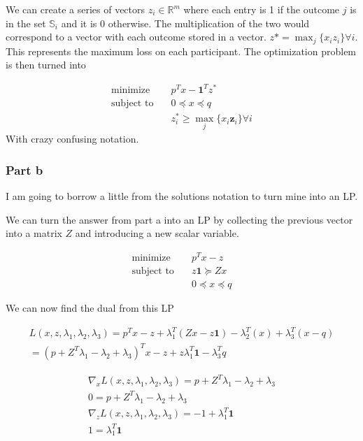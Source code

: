 We can create a series of vectors $z_i \in \mathbb{R}^m$ where each entry is 1 if the outcome $j$ is in the set $\mathbb{S}_i$ and it is 0 otherwise. The multiplication of the two would correspond to a vector with each outcome stored in a vector. $z* = \max_{j} \{ x_i z_i \} \forall i$. This represents the maximum loss on each participant. The optimization problem is then turned into

\begin{align}
  \text{minimize} & \quad p^T x - \textbf{1}^T z^* \\
  \text{subject to} & \quad 0 \preceq x \preceq q \\
  & \quad z_i^* \geq \max_j \{ x_i \textbf{z}_i \} \forall i
\end{align}
With crazy confusing notation.

\subsubsection{Part b}
I am going to borrow a little from the solutions notation to turn mine into an LP.

We can turn the answer from part a into an LP by collecting the previous vector into a matrix $Z$ and introducing a new scalar variable.

\begin{align}
  \text{minimize} & \quad p^T x - z \\
  \text{subject to} & \quad z \textbf{1} \succeq Zx \\
  & \quad 0 \preceq x \preceq q
\end{align}

We can now find the dual from this LP

\begin{equation}
  \begin{aligned}
    L(x,z, \lambda_1, \lambda_2, \lambda_3) = p^T x - z + \lambda_1^T(Zx - z\textbf{1}) - \lambda_2^T(x) + \lambda_3^T(x-q) \\ 
    = (p+ Z^T \lambda_1 - \lambda_2 + \lambda_3 )^T x - z + z\lambda_1^T \textbf{1} - \lambda_3^T q
  \end{aligned}
\end{equation}

\begin{equation}
  \begin{aligned}
    \nabla_x L(x,z, \lambda_1, \lambda_2, \lambda_3) = p+ Z^T \lambda_1 - \lambda_2 + \lambda_3 \\
    0 = p+ Z^T \lambda_1 - \lambda_2 + \lambda_3 \\
    \nabla_z L(x,z, \lambda_1, \lambda_2, \lambda_3) = -1 + \lambda_1^T \textbf{1} \\
    1 = \lambda_1^T \textbf{1}
  \end{aligned}
\end{equation}

